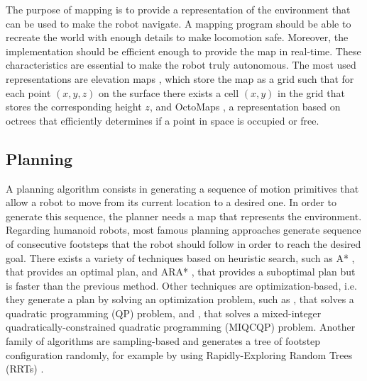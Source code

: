 The purpose of mapping is to provide a representation of the environment that
can be used to make the robot navigate. A mapping program should be able to
recreate the world with enough details to make locomotion safe. Moreover,
the implementation should be efficient enough to provide the map in real-time.
These characteristics are essential to make the robot truly autonomous.
The most used representations are elevation maps
\cite{Siciliano2016HandbookRobotics}, which store the map as a grid such that
for each point $(x, y, z)$ on the surface there exists a cell $(x, y)$ in the 
grid that stores the corresponding height $z$, and OctoMaps
\cite{Hornung2013OctoMap}, a representation based on octrees that efficiently
determines if a point in space is occupied or free.

\subsection{Planning}
A planning algorithm consists in generating a sequence of motion primitives
that allow a robot to move from its current location to a desired one. In
order to generate this sequence, the planner needs a map that represents
the environment. Regarding humanoid robots, most famous planning approaches
generate sequence of consecutive footsteps that the robot should follow in order
to reach the desired goal. There exists a variety of techniques based on
heuristic search, such as A* \cite{Chestnutt2005FootstepPlanningASIMO}, that
provides an optimal plan, and ARA*
\cite{Hornung2012AnytimeSearchBasedFootstepPlanning}, that provides a suboptimal
plan but is faster than the previous method. Other techniques are 
optimization-based, i.e. they generate a plan by solving an optimization 
problem, such as \cite{Herdt2010OnlineWalkingMotionGenerationWithAFSP}, that
solves a quadratic programming (QP) problem, and
\cite{Deits2015FootstepPlanningUnevenTerrainMIQCQP}, that solves a 
mixed-integer quadratically-constrained quadratic programming (MIQCQP) problem.
Another family of algorithms are sampling-based and generates a tree of 
footstep configuration randomly, for example by using Rapidly-Exploring
Random Trees (RRTs) \cite{ECC19}.

